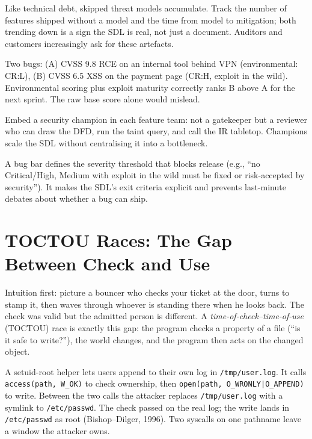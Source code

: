 \begin{remark}
Like technical debt, skipped threat models accumulate. Track the number of features shipped without a model and the time from model to mitigation; both trending down is a sign the SDL is real, not just a document. Auditors and customers increasingly ask for these artefacts.

\end{remark}


\begin{example}
Two bugs: (A) CVSS 9.8 RCE on an internal tool behind VPN (environmental: CR:L), (B) CVSS 6.5 XSS on the payment page (CR:H, exploit in the wild). Environmental scoring plus exploit maturity correctly ranks B above A for the next sprint. The raw base score alone would mislead.
\end{example}

\begin{remark}
Embed a security champion in each feature team: not a gatekeeper but a reviewer who can draw the DFD, run the taint query, and call the IR tabletop. Champions scale the SDL without centralising it into a bottleneck.
\end{remark}


\begin{remark}
A bug bar defines the severity threshold that blocks release (e.g., ``no Critical/High, Medium with exploit in the wild must be fixed or risk-accepted by security''). It makes the SDL's exit criteria explicit and prevents last-minute debates about whether a bug can ship.
\end{remark}

\section{TOCTOU Races: The Gap Between Check and Use}
\label{sec:toctou}
Intuition first: picture a bouncer who checks your ticket at the door,
turns to stamp it, then waves through whoever is standing there when he
looks back. The check was valid but the admitted person is different. A
\emph{time-of-check--time-of-use} (TOCTOU) race is exactly this gap: the
program checks a property of a file (``is it safe to write?''), the world
changes, and the program then acts on the changed object.

\begin{example}
A setuid-root helper lets users append to their own log in
\texttt{/tmp/user.log}. It calls \texttt{access(path, W\_OK)} to check
ownership, then \texttt{open(path, O\_WRONLY|O\_APPEND)} to write. Between
the two calls the attacker replaces \texttt{/tmp/user.log} with a symlink
to \texttt{/etc/passwd}. The check passed on the real log; the write lands
in \texttt{/etc/passwd} as root (Bishop--Dilger, 1996). Two syscalls on one
pathname leave a window the attacker owns.
\end{example}

